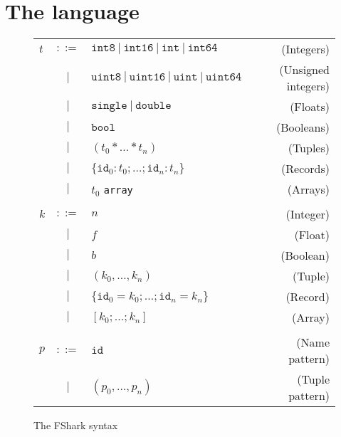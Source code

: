 \chapter{The \fshark{} language}
\label{chap:fsharklanguage}


\begin{figure}
  \centering
  \begin{tabular}{lclr}
    $t$ & $::=$ & $\texttt{int8}~|~\texttt{int16} ~|~ \texttt{int} ~ |~\texttt{int64} $ & (Integers) \\
        & $|$   & $\texttt{uint8} ~ | ~\texttt{uint16} ~|~\texttt{uint} ~|~\texttt{uint64} $ & (Unsigned integers) \\
        & $|$   & $\texttt{single} ~| ~\texttt{double}$ & (Floats) \\
        & $|$   & $\texttt{bool}$ & (Booleans) \\
        & $|$   & $(t_0 * \ldots * t_n)$ & (Tuples) \\
        & $|$   & $\{\texttt{id}_0:t_0 ; \ldots ; \texttt{id}_n:t_n\}$ & (Records) \\
        & $|$   & $t_0$ \texttt{array} & (Arrays) \\
    \\

    $k$ & $::=$ & $n$ & (Integer) \\
        & $|$   & $f$ & (Float) \\
        & $|$   & $b$ & (Boolean) \\
        & $|$   & $(k_0 , \ldots , k_n)$ & (Tuple) \\
        & $|$   & $\{\texttt{id}_0=k_0 ; \ldots ; \texttt{id}_n=k_n\}$ & (Record) \\
        & $|$   & $[k_0 ; \ldots ; k_n]$ & (Array) \\
    \\

    $p$ & $::=$ & $\texttt{id}$ & (Name pattern) \\
        & $|$   & $(p_0, \ldots, p_n)$ & (Tuple pattern) \\
  \end{tabular}
  \caption{The FShark syntax}
\end{figure}

